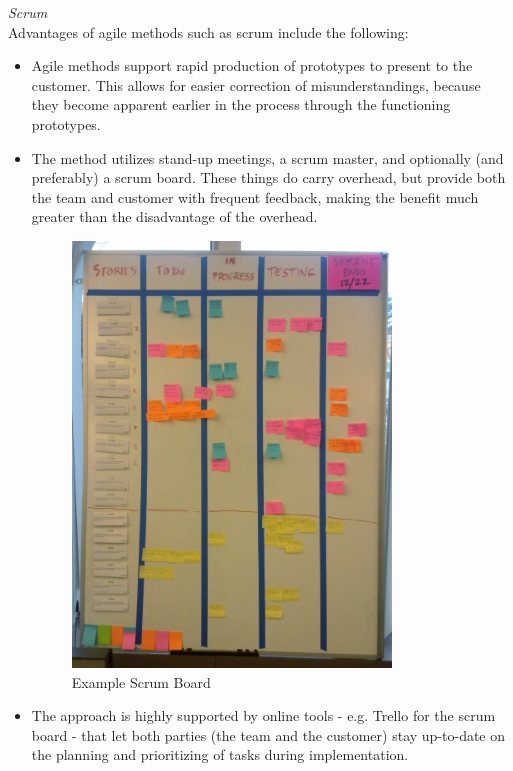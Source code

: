 \emph{Scrum} \\

Advantages of agile methods such as scrum include the following:
	\begin{itemize}
		\item Agile methods support rapid production of prototypes to present to the customer. This allows for easier correction of misunderstandings, because they become apparent earlier in the process through the functioning prototypes.
		\item The method utilizes stand-up meetings, a scrum master, and optionally (and preferably) a scrum board. These things do carry overhead, but provide both the team and customer with frequent feedback, making the benefit much greater than the disadvantage of the overhead.
		
		\begin{figure}[H]
		\centering
		\includegraphics[width=0.8\textwidth]{images/Scrum_task_board.jpg}
		\caption{Example Scrum Board \cite{scrumBoard}}
		\label{fig:scrum_board}
		\end{figure}
		
		\item The approach is highly supported by online tools - e.g. Trello for the scrum board - that let both parties (the team and the customer) stay up-to-date on the planning and prioritizing of tasks during implementation.
	\end{itemize}
